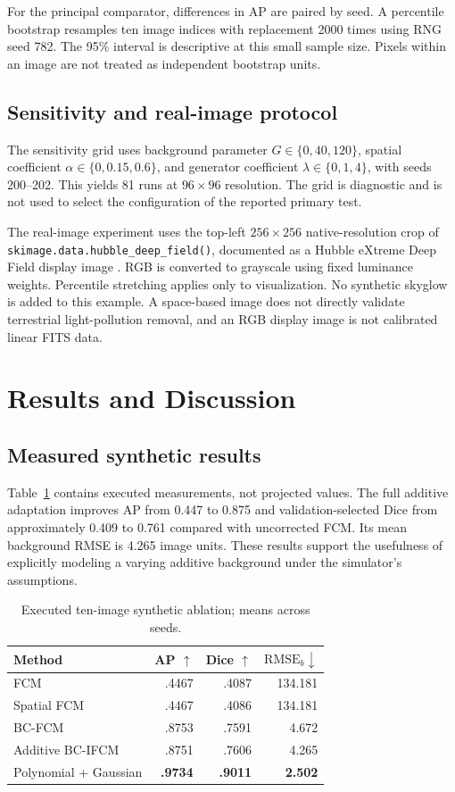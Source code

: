 \documentclass[conference]{IEEEtran}
\begin{document}
For the principal comparator, differences in AP are paired by seed. A percentile bootstrap resamples ten image indices with replacement 2000 times using RNG seed 782. The 95\% interval is descriptive at this small sample size. Pixels within an image are not treated as independent bootstrap units.

\subsection{Sensitivity and real-image protocol}
The sensitivity grid uses background parameter $G\in\{0,40,120\}$, spatial coefficient $\alpha\in\{0,0.15,0.6\}$, and generator coefficient $\lambda\in\{0,1,4\}$, with seeds 200--202. This yields 81 runs at $96\times96$ resolution. The grid is diagnostic and is not used to select the configuration of the reported primary test.

The real-image experiment uses the top-left $256\times256$ native-resolution crop of \texttt{skimage.data.hubble\_deep\_field()}, documented as a Hubble eXtreme Deep Field display image \cite{hubble}. RGB is converted to grayscale using fixed luminance weights. Percentile stretching applies only to visualization. No synthetic skyglow is added to this example. A space-based image does not directly validate terrestrial light-pollution removal, and an RGB display image is not calibrated linear FITS data.

\section{Results and Discussion}
\subsection{Measured synthetic results}
Table~\ref{tab:main} contains executed measurements, not projected values. The full additive adaptation improves AP from 0.447 to 0.875 and validation-selected Dice from approximately 0.409 to 0.761 compared with uncorrected FCM. Its mean background RMSE is 4.265 image units. These results support the usefulness of explicitly modeling a varying additive background under the simulator's assumptions.

\begin{table}[t]
\caption{Executed ten-image synthetic ablation; means across seeds.}
\label{tab:main}
\centering
\begin{tabular}{lrrr}
\toprule
Method & AP $\uparrow$ & Dice $\uparrow$ & $\mathrm{RMSE}_b\downarrow$\\
\midrule
FCM & .4467 & .4087 & 134.181\\
Spatial FCM & .4467 & .4086 & 134.181\\
BC-FCM & .8753 & .7591 & 4.672\\
Additive BC-IFCM & .8751 & .7606 & 4.265\\
Polynomial + Gaussian & \textbf{.9734} & \textbf{.9011} & \textbf{2.502}\\
\bottomrule
\end{tabular}
\end{table}
\end{document}
